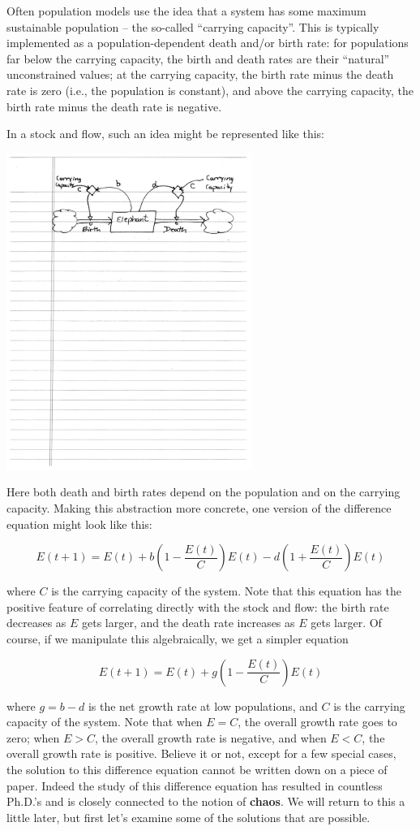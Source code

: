 Often population models use the idea that a system has some maximum sustainable population -- the so-called ``carrying capacity''.  This is typically implemented as a population-dependent death and/or birth rate:  for populations far below the carrying capacity, the birth and death rates are their ``natural'' unconstrained values; at the carrying capacity, the birth rate minus the death rate is zero (i.e., the population is constant), and above the carrying capacity, the birth rate minus the death rate is negative.

In a stock and flow, such an idea might be represented like this:

\centerline{\includegraphics[width=8cm]{figs/carrying_capacity_model}}

Here both death and birth rates depend on the population and on the carrying capacity.  Making this abstraction more concrete, one version of the difference equation might look like this:

$$E(t+1) = E(t) + b(1-\frac{E(t)}{C}) E(t) - d(1+\frac{E(t)}{C})E(t)$$

where $C$ is the carrying capacity of the system.  Note that this equation has the positive feature of correlating directly with the stock and flow:  the birth rate decreases as $E$ gets larger, and the death rate increases as $E$ gets larger.  Of course, if we manipulate this algebraically, we get a simpler equation
 
$$E(t+1) = E(t) + g(1-\frac{E(t)}{C})E(t)$$

where $g = b-d$ is the net growth rate at low populations, and $C$ is the carrying capacity of the system.  Note that when $E=C$, the overall growth rate goes to zero; when $E>C$, the overall growth rate is negative, and when $E<C$, the overall growth rate is positive. Believe it or not, except for a few special cases, the solution to this difference equation cannot be written down on a piece of paper. Indeed the study of this difference equation has resulted in countless Ph.D.'s and is closely connected to the notion of {\bf chaos}. We will return to this a little later, but first let's examine some of the solutions that are possible. 

